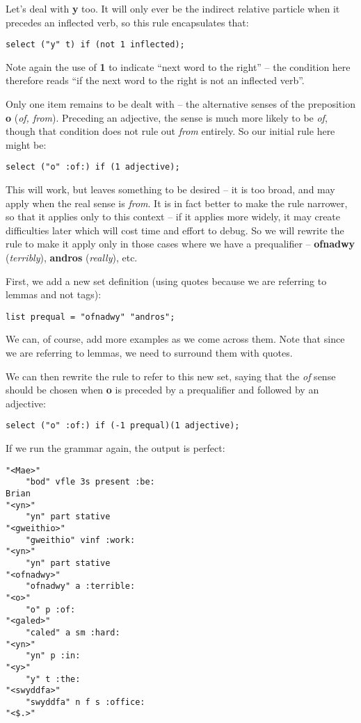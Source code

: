 \documentclass[a4paper,10pt]{article}
\begin{document}
Let's deal with \textbf{y} too.  It will only ever be the indirect relative particle when it precedes an inflected verb, so this rule encapsulates that:
\begin{Verbatim}[tabsize=4]
select ("y" t) if (not 1 inflected);
\end{Verbatim}
Note again the use of \textbf{1} to indicate ``next word to the right'' -- the condition here therefore reads ``if the next word to the right is not an inflected verb''.

Only one item remains to be dealt with -- the alternative senses of the preposition \textbf{o} (\textit{of, from}).  Preceding an adjective, the sense is much more likely to be \textit{of}, though that condition does not rule out \textit{from} entirely.  So our initial rule here might be:
\begin{Verbatim}[tabsize=4]
select ("o" :of:) if (1 adjective);
\end{Verbatim}
This will work, but leaves something to be desired -- it is too broad, and may apply when the real sense is \textit{from}.  It is in fact better to make the rule narrower, so that it applies only to this context -- if it applies more widely, it may create difficulties later which will cost time and effort to debug.  So we will rewrite the rule to make it apply only in those cases where we have a prequalifier -- \textbf{ofnadwy} (\textit{terribly}), \textbf{andros} (\textit{really}), etc.

First, we add a new set definition (using quotes because we are referring to lemmas and not tags):
\begin{Verbatim}[tabsize=4]
list prequal = "ofnadwy" "andros";
\end{Verbatim}
We can, of course, add more examples as we come across them.  Note that since we are referring to lemmas, we need to surround them with quotes.

We can then rewrite the rule to refer to this new set, saying that the \textit{of} sense should be chosen when \textbf{o} is preceded by a prequalifier and followed by an adjective:
\begin{Verbatim}[tabsize=4]
select ("o" :of:) if (-1 prequal)(1 adjective);
\end{Verbatim}

If we run the grammar again, the output is perfect:
\begin{Verbatim}[tabsize=4]
"<Mae>"
	"bod" vfle 3s present :be:
Brian
"<yn>"
	"yn" part stative
"<gweithio>"
	"gweithio" vinf :work:
"<yn>"
	"yn" part stative
"<ofnadwy>"
	"ofnadwy" a :terrible:
"<o>"
	"o" p :of:
"<galed>"
	"caled" a sm :hard:
"<yn>"
	"yn" p :in:
"<y>"
	"y" t :the:
"<swyddfa>"
	"swyddfa" n f s :office:
"<$.>"
\end{Verbatim}
\end{document}
